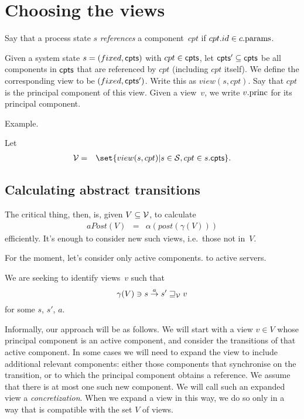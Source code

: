 
\section{Choosing the views}

Say that a process state $s$ \emph{references} a component~$cpt$ if
$cpt.id \in c.\mathrm{params}$. 

Given a system state $s = (fixed, \mathsf{cpts})$ with $cpt \in \mathsf{cpts}$, let $\mathsf{cpts}'
\subseteq \mathsf{cpts}$ be all components in $\mathsf{cpts}$ that are referenced by $cpt$
(including $cpt$ itself).  We define the corresponding view to be $(fixed,
\mathsf{cpts}')$.  Write this as $view(s, cpt)$.  Say that $cpt$ is the principal
component of this view.  Given a view~$v$, we write $v.\mathrm{princ}$ for its
principal component.

Example.


Let 
\begin{eqnarray*}
\V & = & 
  \set{view(s, cpt) | s \in \S, cpt \in s.\cpt}. %
\end{eqnarray*}



\subsection{Calculating abstract transitions}

The critical thing, then, is, given $V \subseteq \mathcal{V}$, to calculate
\begin{eqnarray*}
aPost(V) & = & \alpha(post(\gamma(V)))
\end{eqnarray*}
efficiently.  It's enough to consider new such views, i.e.~those not in~$V$. 

For the moment, let's consider only active components.   to
active servers.

We are seeking to identify views~$v$ such that
\[
\gamma(V) \ni s \stackrel{a}\rightarrow s' \sqsupseteq_{\mathcal{V}} v
\]
for some $s$, $s'$, $a$.

Informally, our approach will be as follows.  We will start with a view $v \in
V$ whose principal component is an active component, and consider the
transitions of that active component.  In some cases we will need to expand
the view to include additional relevant components: either those components
that synchronise on the transition, or to which the principal component
obtains a reference.  We assume that there is at most one such new component.
We will call such an expanded view a \emph{concretization}.  When we expand a
view in this way, we do so only in a way that is compatible with the set $V$
of views.

